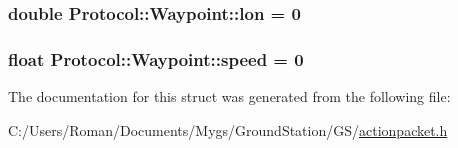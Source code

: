 \subsubsection[{lon}]{\setlength{\rightskip}{0pt plus 5cm}double Protocol\+::\+Waypoint\+::lon = 0}\label{struct_protocol_1_1_waypoint_ac5f0dd73ea290deb60ea7464b114faa7}
\hypertarget{struct_protocol_1_1_waypoint_aa92f0aab1641e5bdb5ea7a9b9d6994ad}{}
\subsubsection[{speed}]{\setlength{\rightskip}{0pt plus 5cm}float Protocol\+::\+Waypoint\+::speed = 0}\label{struct_protocol_1_1_waypoint_aa92f0aab1641e5bdb5ea7a9b9d6994ad}


The documentation for this struct was generated from the following file\+:\begin{DoxyCompactItemize}
\item 
C\+:/\+Users/\+Roman/\+Documents/\+Mygs/\+Ground\+Station/\+G\+S/\hyperlink{actionpacket_8h}{actionpacket.\+h}\end{DoxyCompactItemize}
